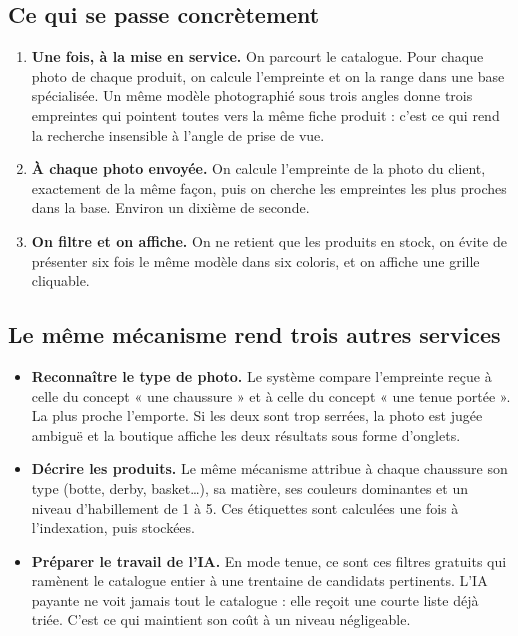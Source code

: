 \documentclass[11pt,a4paper]{article}
\begin{document}
\subsection{Ce qui se passe concrètement}

\begin{enumerate}
  \item \textbf{Une fois, à la mise en service.} On parcourt le catalogue.
  Pour chaque photo de chaque produit, on calcule l'empreinte et on la range
  dans une base spécialisée. Un même modèle photographié sous trois angles donne
  trois empreintes qui pointent toutes vers la même fiche produit : c'est ce qui
  rend la recherche insensible à l'angle de prise de vue.

  \item \textbf{À chaque photo envoyée.} On calcule l'empreinte de la photo du
  client, exactement de la même façon, puis on cherche les empreintes les plus
  proches dans la base. Environ un dixième de seconde.

  \item \textbf{On filtre et on affiche.} On ne retient que les produits en
  stock, on évite de présenter six fois le même modèle dans six coloris, et on
  affiche une grille cliquable.
\end{enumerate}

\subsection{Le même mécanisme rend trois autres services}

\begin{itemize}
  \item \textbf{Reconnaître le type de photo.} Le système compare l'empreinte
  reçue à celle du concept « une chaussure » et à celle du concept « une tenue
  portée ». La plus proche l'emporte. Si les deux sont trop serrées, la photo
  est jugée ambiguë et la boutique affiche les deux résultats sous forme
  d'onglets.

  \item \textbf{Décrire les produits.} Le même mécanisme attribue à chaque
  chaussure son type (botte, derby, basket\ldots), sa matière, ses couleurs
  dominantes et un niveau d'habillement de 1 à 5. Ces étiquettes sont calculées
  une fois à l'indexation, puis stockées.

  \item \textbf{Préparer le travail de l'IA.} En mode tenue, ce sont ces filtres
  gratuits qui ramènent le catalogue entier à une trentaine de candidats
  pertinents. L'IA payante ne voit jamais tout le catalogue : elle reçoit une
  courte liste déjà triée. C'est ce qui maintient son coût à un niveau
  négligeable.
\end{itemize}
\end{document}

